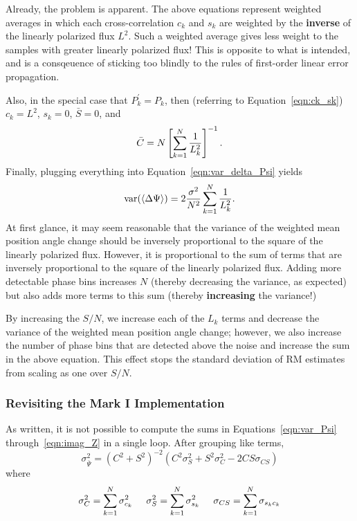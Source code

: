 \documentclass[12pt]{article}
\begin{document}
Already, the problem is apparent.  The above equations represent weighted averages in which each cross-correlation
$c_k$ and $s_k$ are weighted by the {\bf inverse} of the linearly polarized flux $L^2$.  Such a weighted average
gives less weight to the samples with greater linearly polarized flux!  This is opposite to what is intended,
and is a consqeuence of sticking too blindly to the rules of first-order linear error propagation.

Also, in the special case that $P_k^\prime = P_k$, then (referring to Equation~\ref{eqn:ck_sk}) 
$c_k=L^2$, $s_k=0$, $\bar S = 0$, and
\begin{equation}
\bar C = N \left[ \sum_{k=1}^N{1\over L_k^2} \right]^{-1}.
\end{equation}
%
Finally, plugging everything into Equation~\ref{eqn:var_delta_Psi} yields
\begin{equation}
{\mathrm{var}}(\langle\Delta\Psi\rangle) = 2 {\sigma^2 \over N^2} \sum_{k=1}^N{1\over L_k^2}.
\end{equation}
%
At first glance, it may seem reasonable that the variance of the weighted mean position angle change
should be inversely proportional to the square of the linearly polarized flux.  However, it is proportional
to the sum of terms that are inversely proportional to the square of the linearly polarized flux.
Adding more detectable phase bins increases $N$ (thereby decreasing the variance, as expected) but also adds more terms 
to this sum (thereby {\bf increasing} the variance!)

By increasing the $S/N$, we increase each of the $L_k$ terms and decrease the variance of the weighted mean position angle change; however, we also increase the number of phase bins that are detected above the noise and increase the sum in the above equation.  This effect stops the standard deviation of RM estimates from scaling as one over $S/N$.  

\subsubsection{Revisiting the Mark I Implementation}

As written, it is not possible to compute the sums in Equations~\ref{eqn:var_Psi}
through~\ref{eqn:imag_Z} in a single loop.  After grouping like terms,
%
\begin{equation}
\sigma_{\bar\Psi}^2 =
(C^2+S^2)^{-2} \left(C^2 \sigma_S^2 + S^2 \sigma_C^2 - 2 CS \sigma_{CS} \right)
\label{eqn:var_Psi_simplified}
\end{equation}
%
where
\begin{equation}
\sigma_C^2 = \sum_{k=1}^N \sigma_{c_k}^2
\hspace{5mm}
\sigma_S^2 = \sum_{k=1}^N \sigma_{s_k}^2 
\hspace{5mm}
\sigma_{CS} = \sum_{k=1}^N \sigma_{s_k c_k}
\label{eqn:var_covar_C_S}
\end{equation}
\end{document}
